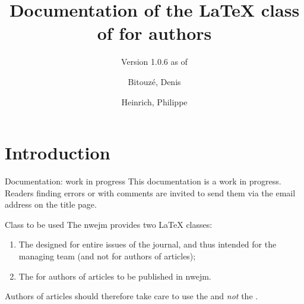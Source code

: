 \documentclass[english,nolocaltoc]{nwejmart}
\newcommand{\releaseversion}{1.0.6}
\newtheorem[style=definition]{fact}
\newtheorem[title=experience]{experience}
\newtheorem[title-plural=rings]{ring}
\newtheorem[title=ideal,title-plural=ideals]{ideal}
\begin{document}
\title[Documentation of the \LaTeX{} class of
\texorpdfstring{\nwejm}{NWEJM}]{Documentation of the \LaTeX{} class of \nwejm*{}
  for authors}%
%
\subtitle[Version \releaseversion{} (\DTMusedate{release-date})]{\small Version
  \releaseversion{} as of }%
%
\author[%
affiliation={%
  Université du Littoral Côte d'Opale, Laboratoire de math\'ematiques pures et
  appliqu\'ees (\nolinkurl{denis.bitouze@univ-littoral.fr})%
},%
]{Bitouzé, Denis}
\author[%
affiliation={%
  Université de Lille, Laboratoire Paul Painlevé UMR CNRS 8524 (\nolinkurl{philippe.heinrich@univ-lille.fr})%
},%
]{Heinrich, Philippe}
%
\maketitle
%
\etocarticlestylenomarks
\localtableofcontents
%

\section{Introduction}
\label{sec-introduction}

\begin{dbremark}{Documentation: work in progress}{}
This documentation is a work in progress. Readers finding errors or with comments are invited to send them via the email address on the title page.
\end{dbremark}

\begin{dbwarning}{Class to be used}{}
  The \gls{nwejm} provides two \LaTeX{} classes:
  \begin{enumerate}
  \item The \nwejmcl{} designed for entire issues of the journal, and thus intended for the \nwejm{} managing team (and not for authors of articles);
  \item The \nwejmauthorcl{} for authors of articles to be published in \gls{nwejm}.
  \end{enumerate}
  Authors of articles should therefore take care to use the \nwejmauthorcl{}
  and \emph{not} the \nwejmcl{}.
\end{dbwarning}
\end{document}
